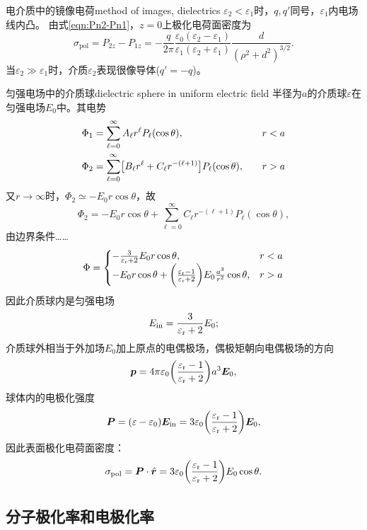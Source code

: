 \begin{example}{电介质中的镜像电荷}{method of images, dielectrics}
    $\varepsilon_2<\varepsilon_1$时，$q,q'$同号，$\varepsilon_1$内电场线内凸。
    \tcblower 
    由式\eqref{eqn:Pn2-Pn1}，$z=0$上极化电荷面密度为
    \[
        \sigma_\text{pol}=P_{2z}-P_{1z}=-\frac q{2\pi}\frac{\varepsilon_0(\varepsilon_2-\varepsilon_1)}{\varepsilon_1(\varepsilon_2+\varepsilon_1)}\frac d{(\rho^2+d^2)^{3/2}}.
    \]
    当$\varepsilon_2\gg\varepsilon_1$时，介质$\varepsilon_2$表现很像导体($q'=-q$)。
\end{example}
\begin{example}{匀强电场中的介质球}{dielectric sphere in uniform electric field}
    半径为$a$的介质球$\varepsilon$在匀强电场$E_0$中。其电势
    \begin{alignat*}{2}
        \Phi_1&=\sum_{\ell=0}^\infty A_\ell r^\ell P_\ell(\cos\theta),&\quad&r<a\\
        \Phi_2&=\sum_{\ell=0}^\infty\bigl[B_\ell r^\ell+C_\ell r^{-(\ell+1)}\bigr]P_\ell(\cos\theta),&&r>a
    \end{alignat*}
    又$r\to\infty$时，$\Phi_2\simeq -E_0r\cos\theta$，故 
    \[
        \Phi_2=-E_0r\cos\theta+\sum_{\ell=0}^\infty C_\ell r^{-(\ell+1)}P_\ell(\cos\theta),
    \]
    由边界条件……
    \[
        \Phi=\begin{cases}
            -\frac{3}{\varepsilon_\text r+2}E_0r\cos\theta,&r<a\\
            -E_0r\cos\theta+\biggl(\frac{\varepsilon_\text r-1}{\varepsilon_\text r+2}\biggr)E_0\frac{a^3}{r^2}\cos\theta,&r>a
        \end{cases}
    \]
    因此介质球内是匀强电场
    \[
        E_\text{in}=\frac{3}{\varepsilon_\text r+2}E_0;
    \]
    介质球外相当于外加场$E_0$加上原点的电偶极场，偶极矩朝向电偶极场的方向
    \[
        \bm p=4\pi\varepsilon_0\biggl(\frac{\varepsilon_\text r-1}{\varepsilon_\text r+2}\biggr)a^3\bm E_0,
    \]
    球体内的电极化强度
    \begin{equation}
        \label{eqn:P-E}
        \bm P=(\varepsilon-\varepsilon_0)\bm E_\text{in}=3\varepsilon_0\biggl(\frac{\varepsilon_\text r-1}{\varepsilon_\text r+2}\biggr)\bm E_0,
    \end{equation}
    因此表面极化电荷面密度：
    \[
        \sigma_\text{pol}=\bm P\cdot\mathop{}\!\hat{\bm{r}}=3\varepsilon_0\biggl(\frac{\varepsilon_\text r-1}{\varepsilon_\text r+2}\biggr)E_0\cos\theta.
    \]
\end{example}

\subsection{分子极化率和电极化率}
\label{ssec:molecular polarizability and electric susceptibility}

